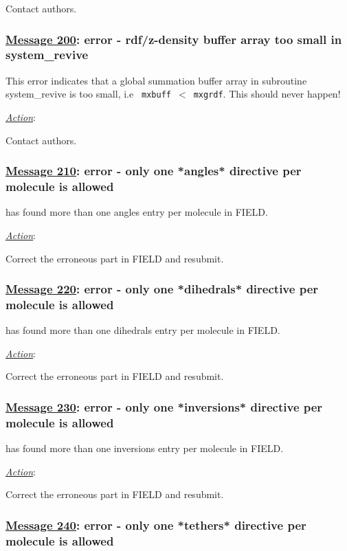Contact \D authors.

\subsubsection*{\underline{Message 200}: error - rdf/z-density buffer array too small in system\_revive}

This error indicates that a global summation buffer array in
subroutine {\sc system\_revive} is too small, i.e {\tt
mxbuff}~$<$~{\tt mxgrdf}.  This should never happen!

\noindent \underline{\em Action}:

Contact \D authors.

\subsubsection*{\underline{Message 210}: error - only one *angles* directive per molecule is allowed}

\D has found more than one angles entry per molecule in FIELD.

\noindent \underline{\em Action}:

Correct the erroneous part in FIELD and resubmit.

\subsubsection*{\underline{Message 220}: error - only one *dihedrals* directive per molecule is allowed}

\D has found more than one dihedrals entry per molecule in FIELD.

\noindent \underline{\em Action}:

Correct the erroneous part in FIELD and resubmit.

\subsubsection*{\underline{Message 230}: error - only one *inversions* directive per molecule is allowed}

\D has found more than one inversions entry per molecule in FIELD.

\noindent \underline{\em Action}:

Correct the erroneous part in FIELD and resubmit.

\subsubsection*{\underline{Message 240}: error - only one *tethers* directive per molecule is allowed}

